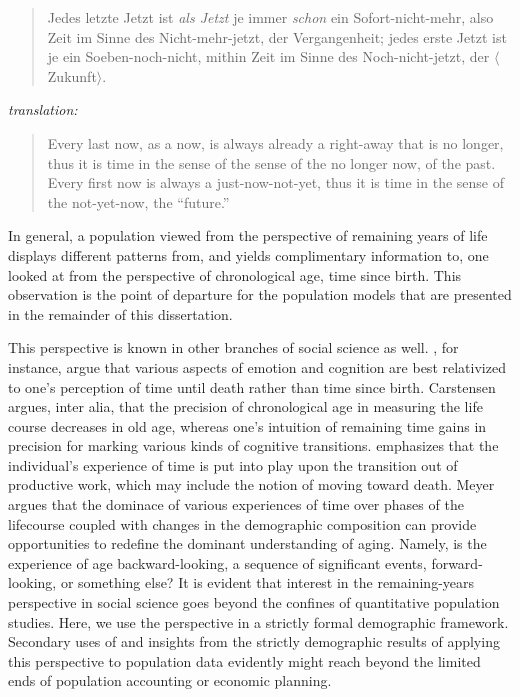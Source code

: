  \FloatBarrier
 \label{ch:newpersp}
\begin{singlespace}
\begin{quote}
Jedes letzte Jetzt ist \textit{als Jetzt} je immer \textit{schon} ein
Sofort-nicht-mehr, also Zeit im Sinne des Nicht-mehr-jetzt, der Vergangenheit;
jedes erste Jetzt ist je ein Soeben-noch-nicht, mithin Zeit im Sinne des
Noch-nicht-jetzt, der $\langle$Zukunft$\rangle$.
\citep{heidegger1977sein}
\end{quote}
\textit{translation:}
\begin{quote}
Every last now, as a now, is always already a right-away that is no longer, thus
it is time in the sense of the sense of the no longer now, of the past. Every
first now is always a just-now-not-yet, thus it is time in the sense of the
not-yet-now, the ``future.'' \citep{stambaugh1996being}
\end{quote}
\end{singlespace}

In general, a population viewed from the
perspective of remaining years of life displays different patterns 
from, and yields complimentary information to, one looked at from the
perspective of chronological age, time since birth. This observation is the
point of departure for the population models that are presented in the remainder
of this dissertation. 

This perspective is known in other branches of social science as well.
 \citet{carstensen2006influence,carstensen1999taking}, 
for instance, argue that various aspects of emotion and cognition are best 
relativized to one's perception of time until
death rather than time since birth. Carstensen argues, inter alia, that the
precision of chronological age in measuring the life course decreases in old
age, whereas one's intuition of remaining time gains in precision for marking various
kinds of cognitive transitions. \citet{meyer2008altern} emphasizes that the
individual's experience of time is put into play upon the transition out of
productive work, which may include the notion of moving toward death. Meyer
argues that the dominace of various experiences of time over phases of the
lifecourse coupled with changes in the demographic composition can provide
opportunities to redefine the dominant understanding of aging. Namely, is
the experience of age backward-looking, a sequence of significant events,
forward-looking, or something else? It is evident that interest in the
remaining-years perspective in social science goes beyond the
confines of quantitative population studies. Here, we use the perspective in
a strictly formal demographic framework. Secondary uses of and insights from the
strictly demographic results of applying this perspective to population data
evidently might reach beyond the limited ends of population accounting or
economic planning.

